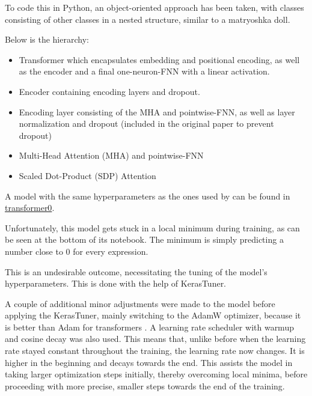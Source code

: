 \documentclass{article}
\begin{document}
To code this in Python, an object-oriented approach has been taken, with classes consisting of other classes in a nested structure, similar to a matryoshka doll.

Below is the hierarchy:

\begin{itemize}
    \item Transformer which encapsulates embedding and positional encoding, as well as the encoder and a final one-neuron-FNN with a linear activation.
    \item Encoder containing encoding layers and dropout.
    \item Encoding layer consisting of the MHA and pointwise-FNN, as well as layer normalization and dropout (included in the original paper to prevent dropout)
    \item Multi-Head Attention (MHA) and pointwise-FNN
    \item Scaled Dot-Product (SDP) Attention
\end{itemize}

A model with the same hyperparameters as the ones used by \cite{vaswani2023attentionneed} can be found in \href{https://github.com/AntonStantan/matura/blob/main/transformer/transformer0.ipynb}{transformer0}.

Unfortunately, this model gets stuck in a local minimum during training, as can be seen at the bottom of its notebook. The minimum is simply predicting a number close to 0 for every expression.

This is an undesirable outcome, necessitating the tuning of the model's hyperparameters. This is done with the help of KerasTuner.

A couple of additional minor adjustments were made to the model before applying the KerasTuner, mainly switching to the AdamW optimizer, because it is better than Adam for transformers \cite{loshchilov2019decoupledweightdecayregularization}. A learning rate scheduler with warmup and cosine decay was also used. This means that, unlike before when the learning rate stayed constant throughout the training, the learning rate now changes. It is higher in the beginning and decays towards the end. This assists the model in taking larger optimization steps initially, thereby overcoming local minima, before proceeding with more precise, smaller steps towards the end of the training.
\end{document}
